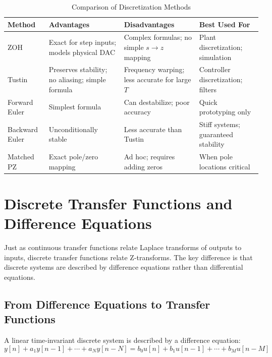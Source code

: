\begin{table}[htbp]
\centering
\caption{Comparison of Discretization Methods}
\label{tab:discretization_comparison}
\begin{tabular}{p{2.5cm}p{3cm}p{3cm}p{4cm}}
\toprule
\textbf{Method} & \textbf{Advantages} & \textbf{Disadvantages} & \textbf{Best Used For} \\
\midrule
ZOH & Exact for step inputs; models physical DAC & Complex formulas; no simple $s \to z$ mapping & Plant discretization; simulation \\[0.5em]
Tustin & Preserves stability; no aliasing; simple formula & Frequency warping; less accurate for large $T$ & Controller discretization; filters \\[0.5em]
Forward Euler & Simplest formula & Can destabilize; poor accuracy & Quick prototyping only \\[0.5em]
Backward Euler & Unconditionally stable & Less accurate than Tustin & Stiff systems; guaranteed stability \\[0.5em]
Matched PZ & Exact pole/zero mapping & Ad hoc; requires adding zeros & When pole locations critical \\
\bottomrule
\end{tabular}
\end{table}


\section{Discrete Transfer Functions and Difference Equations}
\label{sec:discrete_tf}

Just as continuous transfer functions relate Laplace transforms of outputs to inputs, discrete transfer functions relate Z-transforms. The key difference is that discrete systems are described by difference equations rather than differential equations.

\subsection{From Difference Equations to Transfer Functions}

A linear time-invariant discrete system is described by a difference equation:
\begin{equation}
y[n] + a_1 y[n-1] + \cdots + a_N y[n-N] = b_0 u[n] + b_1 u[n-1] + \cdots + b_M u[n-M]
\end{equation}

